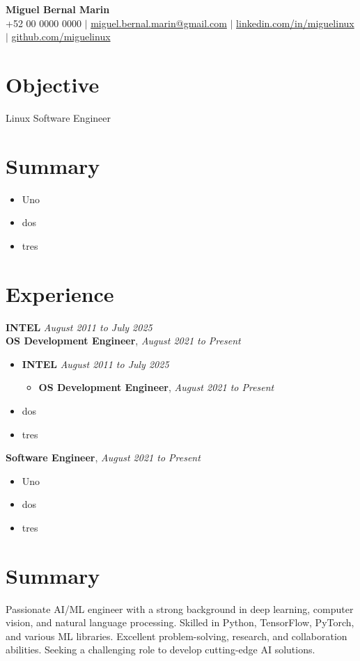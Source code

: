 \documentclass[letterpaper,10pt]{article}
\begin{document}
\begin{center}
  \textbf{\Huge Miguel Bernal Marin} \\
  \small +52 00 0000 0000 $|$ \href{mailto:miguel.bernal.marin@gmail.com}
	{miguel.bernal.marin@gmail.com} $|$ 
  \href{https://linkedin.com/in/miguelinux}{linkedin.com/in/miguelinux} $|$
  \href{https://github.com/miguelinux}{github.com/miguelinux}
\end{center}

\section{Objective}
Linux Software Engineer

\section{Summary}
\begin{itemize}
  \item Uno
  \item dos
  \item tres
\end{itemize}

\section{Experience}
\textbf{INTEL} \hfill \textit{August 2011 to July 2025} \\
\textbf{OS Development Engineer}, \textit{August 2021 to Present}
\begin{itemize}
  \item \textbf{INTEL} \hfill \textit{August 2011 to July 2025}
    \begin{itemize}
      \item \textbf{OS Development Engineer}, \textit{August 2021 to Present}
    \end{itemize}
  \item dos
  \item tres
\end{itemize}
\textbf{Software Engineer}, \textit{August 2021 to Present}
\begin{itemize}
  \item Uno
  \item dos
  \item tres
\end{itemize}


\section{Summary}
Passionate AI/ML engineer with a strong background in deep learning, computer vision, and natural language processing. Skilled in Python, TensorFlow, PyTorch, and various ML libraries. Excellent problem-solving, research, and collaboration abilities. Seeking a challenging role to develop cutting-edge AI solutions.
\end{document}
